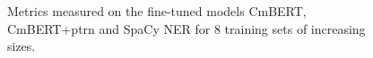 \begin{figure}[ht!]
	  \caption{\label{fig:f1-vs-trainsize} Metrics measured on the fine-tuned models CmBERT, CmBERT+ptrn and SpaCy NER for 8 training sets of increasing sizes.}
\end{figure}
	                                        

